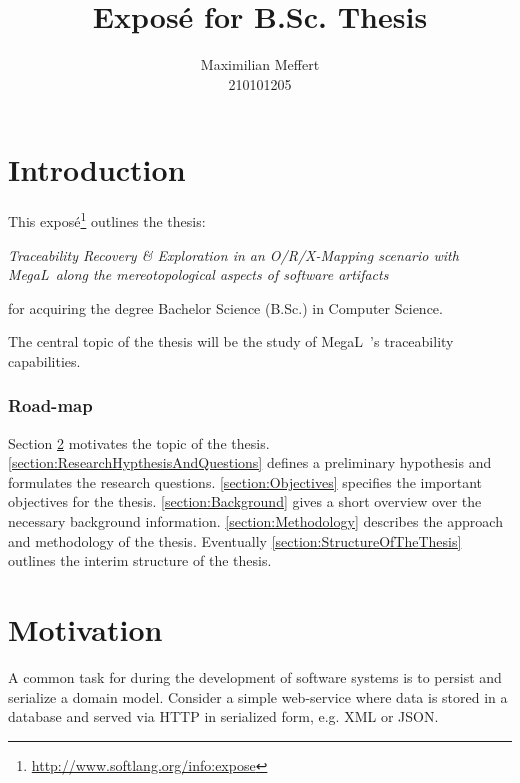 \documentclass[runningheads,a4paper]{llncs}
\title{Exposé for B.Sc. Thesis}
\subtitle{\theTitle}
\author{Maximilian Meffert\\210101205}
\institute{University of Koblenz-Landau}
\newcommand{\megal}{\textsf{MegaL}~}
\newcommand{\theTitle}{Traceability Recovery \& Exploration in an O/R/X-Mapping scenario with \megal along the mereotopological aspects of software artifacts}
\begin{document}
\maketitle
%


\section{Introduction}
This exposé\footnote{\url{http://www.softlang.org/info:expose}} outlines the thesis:
\begin{center}
\it
\theTitle
\end{center}
for acquiring the degree Bachelor Science (B.Sc.) in Computer Science.

The central topic of the thesis will be the study of \megal's traceability capabilities.


\subsubsection{Road-map}
Section \ref{section:Motivation} motivates the topic of the thesis.
\ref{section:ResearchHypthesisAndQuestions} defines a preliminary hypothesis and formulates the research questions.
\ref{section:Objectives} specifies the important objectives for the thesis.
\ref{section:Background} gives a short overview over the necessary background information.
\ref{section:Methodology} describes the approach and methodology of the thesis.
Eventually \ref{section:StructureOfTheThesis} outlines the interim structure of the thesis.


\section{Motivation}
\label{section:Motivation}
A common task for during the development of software systems is to persist and serialize a domain model.
Consider a simple web-service where data is stored in a database and served via HTTP in serialized form, e.g. XML or JSON.
\end{document}
